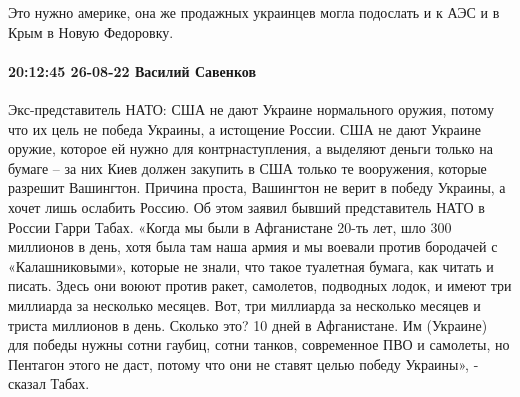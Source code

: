 Это нужно америке, она же продажных украинцев могла подослать и к АЭС и в Крым
в Новую Федоровку.


\paragraph{20:12:45 26-08-22 Василий Савенков}

Экс-представитель НАТО: США не дают Украине нормального оружия, потому что их цель не победа Украины, а истощение России.
США не дают Украине оружие, которое ей нужно для контрнаступления, а выделяют деньги только на бумаге – за них Киев должен закупить в США только те вооружения, которые разрешит Вашингтон. Причина проста, Вашингтон не верит в победу Украины, а хочет лишь ослабить Россию.
Об этом заявил бывший представитель НАТО в России Гарри Табах.
«Когда мы были в Афганистане 20-ть лет, шло 300 миллионов в день, хотя была там наша армия и мы воевали против бородачей с «Калашниковыми», которые не знали, что такое туалетная бумага, как читать и писать. Здесь они воюют против ракет, самолетов, подводных лодок, и имеют три миллиарда за несколько месяцев. Вот, три миллиарда за несколько месяцев и триста миллионов в день. Сколько это? 10 дней в Афганистане. Им (Украине) для победы нужны сотни гаубиц, сотни танков, современное ПВО и самолеты, но Пентагон этого не даст, потому что они не ставят целью победу Украины», - сказал Табах.

